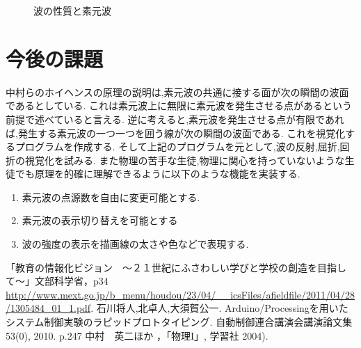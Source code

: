 \documentclass[a4j,twocolumn,uplatex]{jarticle}
\begin{document}
\begin{figure}[htbp]
\caption{{\footnotesize 波の性質と素元波 }}
\label{fig:thomson2clausius}
\end{figure}
\vspace{-6mm}

\section{今後の課題}
中村らのホイヘンスの原理の説明は,素元波の共通に接する面が次の瞬間の波面であるとしている.
これは素元波上に無限に素元波を発生させる点があるという前提で述べていると言える.
逆に考えると,素元波を発生させる点が有限であれば,発生する素元波の一つ一つを囲う線が次の瞬間の波面である.
これを視覚化するプログラムを作成する.
そして上記のプログラムを元として,波の反射,屈折,回折の視覚化を試みる.
また物理の苦手な生徒,物理に関心を持っていないような生徒でも原理を的確に理解できるように以下のような機能を実装する.
\begin{enumerate}
\item 素元波の点源数を自由に変更可能とする.
\item 素元波の表示切り替えを可能とする
\item 波の強度の表示を描画線の太さや色などで表現する.
\end{enumerate}

\vspace{-5mm}
\begin{thebibliography}{9}
「教育の情報化ビジョン　〜２１世紀にふさわしい学びと学校の創造を目指して〜」文部科学省，p34 \url{http://www.mext.go.jp/b_menu/houdou/23/04/__icsFiles/afieldfile/2011/04/28/1305484_01_1.pdf}.
 石川将人,北卓人,大須賀公一. Arduino/Processingを用いたシステム制御実験のラピッドプロトタイピング. 自動制御連合講演会講演論文集 53(0), 2010. p.247 
 中村　英二ほか ，「物理I」, 学習社 2004).


\end{thebibliography}
\end{document}
